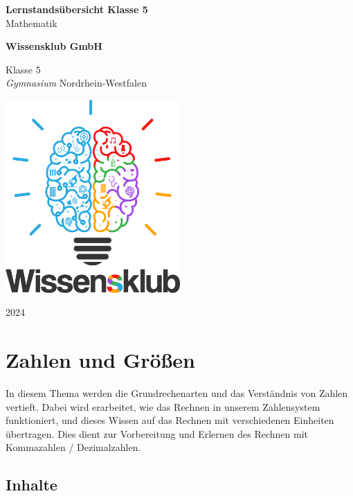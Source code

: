 \documentclass{article}
\begin{document}
\begin{titlepage}
    \begin{center}
        \vspace*{1cm}
            
        \Huge
        \textbf{Lernstandsübersicht Klasse 5}\\            
        \vspace{0.5cm}
        \LARGE
        Mathematik
            
        \vspace{1.5cm}
            
        \textbf{Wissensklub GmbH}
            
        \vfill
            
        Klasse 5\\
        \textit{Gymnasium} Nordrhein-Westfalen
            
        \vspace{0.8cm}
            
        \includegraphics[width=0.5\textwidth]{Wissensklub-Logo.png}
            
        \Large
        2024          
    \end{center}
\end{titlepage}
\section{Zahlen und Größen}
In diesem Thema werden die Grundrechenarten und das Verständnis von Zahlen vertieft. Dabei wird erarbeitet, wie das Rechnen in unserem Zahlensystem funktioniert, und dieses Wissen auf das Rechnen mit verschiedenen Einheiten übertragen.
Dies dient zur Vorbereitung und Erlernen des Rechnen mit Kommazahlen / Dezimalzahlen.
\subsection{Inhalte}
\end{document}
